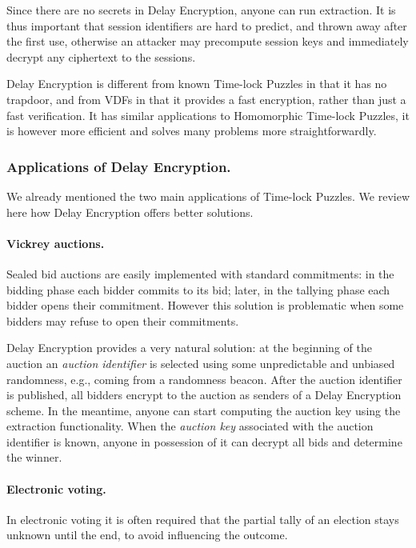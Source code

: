 \documentclass{llncs}
\begin{document}
Since there are no secrets in Delay Encryption, anyone can run
extraction. %
It is thus important that session identifiers are hard to predict, and
thrown away after the first use, otherwise an attacker may precompute
session keys and immediately decrypt any ciphertext to the sessions.

Delay Encryption is different from known Time-lock Puzzles in that it
has no trapdoor, and from VDFs in that it provides a fast encryption,
rather than just a fast verification. %
It has similar applications to Homomorphic Time-lock Puzzles, it is
however more efficient and solves many problems more
straightforwardly.


\subsubsection{Applications of Delay Encryption.}

We already mentioned the two main applications of Time-lock Puzzles. %
We review here how Delay Encryption offers better solutions.

\paragraph{Vickrey auctions.} 
Sealed bid auctions are easily implemented with standard commitments:
in the bidding phase each bidder commits to its bid; later, in the
tallying phase each bidder opens their commitment. %
However this solution is problematic when some bidders may refuse to
open their commitments.
   
Delay Encryption provides a very natural solution: at the beginning of
the auction an \emph{auction identifier} is selected using some unpredictable
and unbiased randomness, e.g., coming from a randomness beacon. %
After the auction identifier is published, all bidders encrypt to the auction
as senders of a Delay Encryption scheme. %
In the meantime, anyone can start computing the auction key using the
extraction functionality. %
When the \emph{auction key} associated with the auction identifier is known,
anyone in possession of it can decrypt all bids and determine the winner.

\paragraph{Electronic voting.} In electronic voting it is often
required that the partial tally of an election stays unknown until the
end, to avoid influencing the outcome. %
\end{document}
